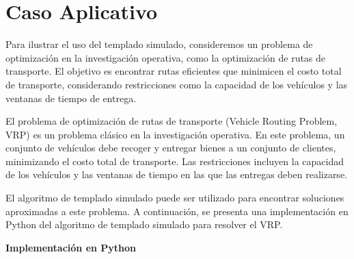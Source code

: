 \documentclass{article}
\begin{document}
\section{Caso Aplicativo}
Para ilustrar el uso del templado simulado, consideremos un problema de optimización en la investigación operativa, como la optimización de rutas de transporte. El objetivo es encontrar rutas eficientes que minimicen el costo total de transporte, considerando restricciones como la capacidad de los vehículos y las ventanas de tiempo de entrega.

El problema de optimización de rutas de transporte (Vehicle Routing Problem, VRP) es un problema clásico en la investigación operativa. En este problema, un conjunto de vehículos debe recoger y entregar bienes a un conjunto de clientes, minimizando el costo total de transporte. Las restricciones incluyen la capacidad de los vehículos y las ventanas de tiempo en las que las entregas deben realizarse.

El algoritmo de templado simulado puede ser utilizado para encontrar soluciones aproximadas a este problema. A continuación, se presenta una implementación en Python del algoritmo de templado simulado para resolver el VRP.

\textbf{Implementación en Python}

\end{document}
